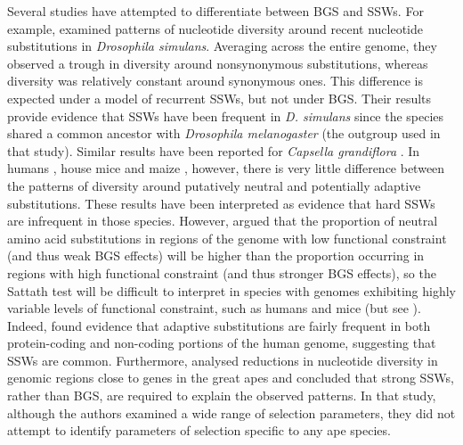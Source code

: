 	Several studies have attempted to differentiate between BGS and SSWs. For example, \cite{RN167} examined patterns of nucleotide diversity around recent nucleotide substitutions in \textit{Drosophila simulans}. Averaging across the entire genome, they observed a trough in diversity around nonsynonymous substitutions, whereas diversity was relatively constant around synonymous ones. This difference is expected under a model of recurrent SSWs, but not under BGS. Their results provide evidence that SSWs have been frequent in \textit{D. simulans} since the species shared a common ancestor with \textit{Drosophila melanogaster} (the outgroup used in that study). Similar results have been reported for \textit{Capsella grandiflora} \citep{RN236}. In humans \citep{RN162}, house mice \citep{RN122} and maize \citep{RN230}, however, there is very little difference between the patterns of diversity around putatively neutral and potentially adaptive substitutions. These results have been interpreted as evidence that hard SSWs are infrequent in those species. However, \cite{RN237} argued that the proportion of neutral amino acid substitutions in regions of the genome with low functional constraint (and thus weak BGS effects) will be higher than the proportion occurring in regions with high functional constraint (and thus stronger BGS effects), so the Sattath test will be difficult to interpret in species with genomes exhibiting highly variable levels of functional constraint, such as humans and mice (but see \citealt{RN230}). Indeed, \cite{RN237} found evidence that adaptive substitutions are fairly frequent in both protein-coding and non-coding portions of the human genome, suggesting that SSWs are common. Furthermore, \cite{RN365} analysed reductions in nucleotide diversity in genomic regions close to genes in the great apes and concluded that strong SSWs, rather than BGS, are required to explain the observed patterns. In that study, although the authors examined a wide range of selection parameters, they did not attempt to identify parameters of selection specific to any ape species.


